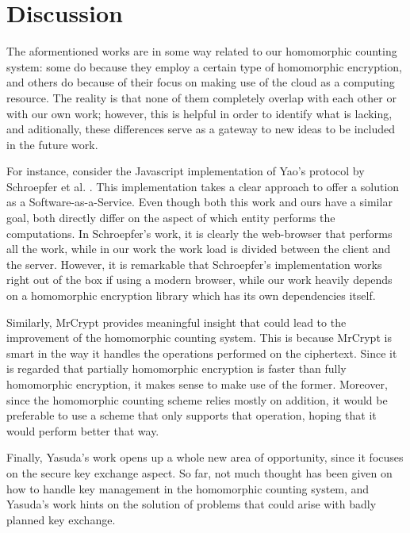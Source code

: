 \section{Discussion}

The aformentioned works are in some way related to our homomorphic counting system: some do because they employ a certain type of homomorphic encryption, and others do because of their focus on making use of the cloud as a computing resource. The reality is that none of them completely overlap with each other or with our own work; however, this is helpful in order to identify what is lacking, and aditionally, these differences serve as a gateway to new ideas to be included in the future work.

For instance, consider the Javascript implementation of Yao's protocol \cite{Yao:1986:GES:1382439.1382944} by Schroepfer et al. \cite{Schroepfer:2011:DSC:2046707.2093509}. This implementation takes a clear approach to offer a solution as a Software-as-a-Service. Even though both this work and ours have a similar goal, both directly differ on the aspect of which entity performs the computations. In Schroepfer's work, it is clearly the web-browser that performs all the work, while in our work the work load is divided between the client and the server. However, it is remarkable that Schroepfer's implementation works right out of the box if using a modern browser, while our work heavily depends on a homomorphic encryption library which has its own dependencies itself.

Similarly, MrCrypt \cite{Tetali:2013:MSA:2544173.2509554} provides meaningful insight that could lead to the improvement of the homomorphic counting system. This is because MrCrypt is smart in the way it handles the operations performed on the ciphertext. Since it is regarded that partially homomorphic encryption is faster than fully homomorphic encryption, it makes sense to make use of the former. Moreover, since the homomorphic counting scheme relies mostly on addition, it would be preferable to use a scheme that only supports that operation, hoping that it would perform better that way.

Finally, Yasuda's \cite{Yasuda:2015:SDD:2732516.2732521} work opens up a whole new area of opportunity, since it focuses on the secure key exchange aspect. So far, not much thought has been given on how to handle key management in the homomorphic counting system, and Yasuda's work hints on the solution of problems that could arise with badly planned key exchange.

